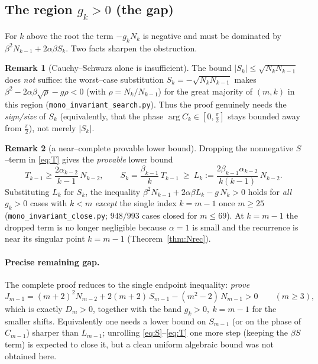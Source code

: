 \documentclass[11pt]{article}
\theoremstyle{definition}
\newtheorem{remark}{Remark}
\begin{document}
\subsection{The region $g_k>0$ (the gap)}

For $k$ above the root the term $-g_kN_k$ is negative and must be dominated by
$\beta^2N_{k-1}+2\alpha\beta S_k$. Two facts sharpen the obstruction.

\begin{remark}[Cauchy--Schwarz alone is insufficient]
The bound $|S_k|\le\sqrt{N_kN_{k-1}}$ does \emph{not} suffice: the worst--case
substitution $S_k=-\sqrt{N_kN_{k-1}}$ makes
$\beta^2-2\alpha\beta\sqrt{\rho}-g\rho<0$ (with $\rho=N_k/N_{k-1}$) for the great
majority of $(m,k)$ in this region (\texttt{mono\_invariant\_search.py}). Thus
the proof genuinely needs the \emph{sign/size} of $S_k$ (equivalently, that the
phase $\arg C_k\in[0,\tfrac\pi2]$ stays bounded away from $\tfrac\pi2$), not
merely $|S_k|$.
\end{remark}

\begin{remark}[a near--complete provable lower bound]
Dropping the nonnegative $S$--term in \eqref{eq:T} gives the \emph{provable}
lower bound
\[
  T_{k-1}\ge \frac{2\alpha_{k-2}}{k-1}\,N_{k-2},\qquad
  S_k=\frac{\beta_{k-1}}{k}\,T_{k-1}\ \ge\
  L_k:=\frac{2\beta_{k-1}\alpha_{k-2}}{k(k-1)}\,N_{k-2}.
\]
Substituting $L_k$ for $S_k$, the inequality
$\beta^2N_{k-1}+2\alpha\beta L_k-g\,N_k>0$ holds for \emph{all} $g_k>0$ cases
with $k<m$ \emph{except} the single index $k=m-1$ once $m\ge25$
(\texttt{mono\_invariant\_close.py}; $948/993$ cases closed for $m\le69$). At
$k=m-1$ the dropped term is no longer negligible because $\alpha=1$ is small and
the recurrence is near its singular point $k=m-1$ (Theorem~\ref{thm:Nrec}).
\end{remark}

\paragraph{Precise remaining gap.}
The complete proof reduces to the single endpoint inequality: \emph{prove}
\[
  J_{m-1}=(m+2)^2 N_{m-2}+2(m+2)\,S_{m-1}-(m^2-2)\,N_{m-1}>0\qquad(m\ge3),
\]
which is exactly $D_m>0$, together with the band $g_k>0,\ k=m-1$ for the smaller
shifts. Equivalently one needs a lower bound on $S_{m-1}$ (or on the phase of
$C_{m-1}$) sharper than $L_{m-1}$; unrolling \eqref{eq:S}--\eqref{eq:T} one more
step (keeping the $\beta S$ term) is expected to close it, but a clean uniform
algebraic bound was not obtained here.
\end{document}
